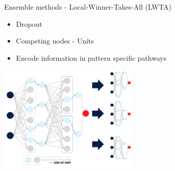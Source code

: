 \documentclass[UKenglish]{beamer}
\begin{document}

\begin{frame}{Ensemble methods - Local-Winner-Takes-All (LWTA)}
    \begin{itemize}
        \item Dropout
        \item Competing nodes - Units
        \item Encode information in pattern specific pathways
    \end{itemize}    
    \centering
    \includegraphics[width = 0.5\textwidth]{figures/Max_out}
\end{frame}
\end{document}
